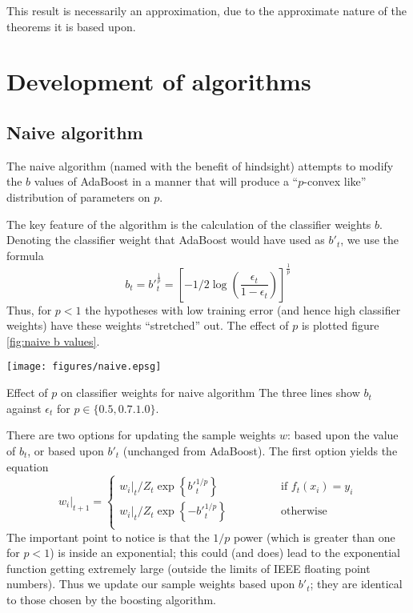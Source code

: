 This result is necessarily an approximation, due to the approximate
nature of the theorems it is based upon.

\section{Development of algorithms}

\subsection{Naive algorithm}

The naive algorithm (named with the benefit of hindsight) attempts to
modify the $b$ values of AdaBoost in a manner that will produce a
``$p$-convex like'' distribution of parameters on $p$.

The key feature of the algorithm is the calculation of the classifier
weights $b$.  Denoting the classifier weight that AdaBoost would have
used as $b'_t$, we use the formula
%
\begin{equation}
b_t = b'_t^\frac{1}{p} = \left[ - 1/2 \log \left( \frac{\epsilon_t}{1
- \epsilon_t} \right) \right]^\frac{1}{p}
\end{equation}
%
Thus, for $p < 1$ the hypotheses with low training error (and hence
high classifier weights) have these weights ``stretched'' out.  The
effect of $p$ is plotted figure \ref{fig:naive b values}.

\begin{linefigure}
\begin{center}
\texttt{[image: figures/naive.epsg]}
\end{center}
\begin{capt}{Effect of $p$ on classifier weights for naive algorithm}
The three lines show $b_t$ against $\epsilon_t$ for $p \in \{ 0.5,
0.7. 1.0 \}$.
\end{capt}
\label{fig:naive b values}
\end{linefigure}

There are two options for updating the sample weights $w$: based upon
the value of $b_t$, or based upon $b'_t$ (unchanged from AdaBoost).
The first option yields the equation
%
\begin{equation}
w_i|_{t+1} = \left\{
\begin{array}{cl}
	w_i|_t / Z_t \exp \left\{ b'_t^{1/p} \right\} & \qquad \qquad \mbox{if
	$f_t(x_i) = y_i$} \\
	w_i|_t / Z_t \exp \left\{ -b'_t^{1/p} \right\} 	& \qquad \qquad
	\mbox{otherwise} \\
\end{array} \right.
\end{equation}
%
The important point to notice is that the $1/p$ power (which is
greater than one for $p < 1$) is inside an exponential; this could
(and does) lead to the exponential function getting extremely large
(outside the limits of IEEE floating point numbers).  Thus we update
our sample weights based upon $b'_t$; they are identical to those
chosen by the boosting algorithm.

